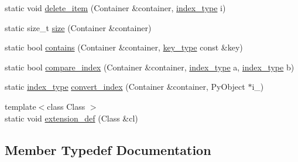 \begin{DoxyCompactItemize}
\item 
static void \hyperlink{classboost_1_1python_1_1std__map__indexing__suite_a9af154020b49d26a30de90bfb07b122d}{delete\+\_\+item} (Container \&container, \hyperlink{classboost_1_1python_1_1std__map__indexing__suite_a4b2ac75883fba93dbca6d9e83197c842}{index\+\_\+type} i)
\item 
static size\+\_\+t \hyperlink{classboost_1_1python_1_1std__map__indexing__suite_a2a7b98e15824d0e74ae4620cbfa636d0}{size} (Container \&container)
\item 
static bool \hyperlink{classboost_1_1python_1_1std__map__indexing__suite_a89557475c8931027399dddf66fb251c1}{contains} (Container \&container, \hyperlink{classboost_1_1python_1_1std__map__indexing__suite_a4e2daeb60a58d6ce9964e0ea27680009}{key\+\_\+type} const \&key)
\item 
static bool \hyperlink{classboost_1_1python_1_1std__map__indexing__suite_a62974da613b1b56663d9736a8612bddd}{compare\+\_\+index} (Container \&container, \hyperlink{classboost_1_1python_1_1std__map__indexing__suite_a4b2ac75883fba93dbca6d9e83197c842}{index\+\_\+type} a, \hyperlink{classboost_1_1python_1_1std__map__indexing__suite_a4b2ac75883fba93dbca6d9e83197c842}{index\+\_\+type} b)
\item 
static \hyperlink{classboost_1_1python_1_1std__map__indexing__suite_a4b2ac75883fba93dbca6d9e83197c842}{index\+\_\+type} \hyperlink{classboost_1_1python_1_1std__map__indexing__suite_a79bc222baa6b652f2f688f2a3add9d75}{convert\+\_\+index} (Container \&container, Py\+Object $\ast$i\+\_\+)
\item 
{\footnotesize template$<$class Class $>$ }\\static void \hyperlink{classboost_1_1python_1_1std__map__indexing__suite_a32aecfee63f8763608a0149050134623}{extension\+\_\+def} (Class \&cl)
\end{DoxyCompactItemize}


\subsection{Member Typedef Documentation}
